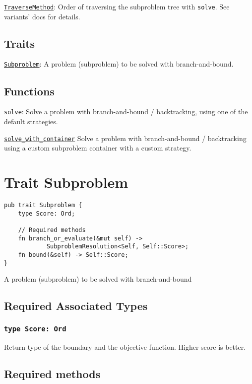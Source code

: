 \hyperlink{apx:TraverseMethod}{\texttt{TraverseMethod}}: Order of traversing the subproblem tree with \texttt{solve}. See variants' docs for details.

\subsection*{Traits}

\hyperlink{apx:Subproblem}{\texttt{Subproblem}}: A problem (subproblem) to be solved with branch-and-bound.

\subsection*{Functions}

\hyperlink{apx:solve}{\texttt{solve}}: Solve a problem with branch-and-bound / backtracking, using one of the default strategies.

\hyperlink{apx:solve_with_container}{\texttt{solve\_with\_container}} Solve a problem with branch-and-bound / backtracking using a custom subproblem container with a custom strategy.

\section*{Trait Subproblem}

\hypertarget{apx:Subproblem}{}

\begin{lstlisting}
pub trait Subproblem {
    type Score: Ord;

    // Required methods
    fn branch_or_evaluate(&mut self) ->
            SubproblemResolution<Self, Self::Score>;
    fn bound(&self) -> Self::Score;
}
\end{lstlisting}

A problem (subproblem) to be solved with branch-and-bound

\subsection*{Required Associated Types}

\subsubsection*{\texttt{type Score: Ord}}

Return type of the boundary and the objective function. Higher score is better.

\subsection*{Required methods}

